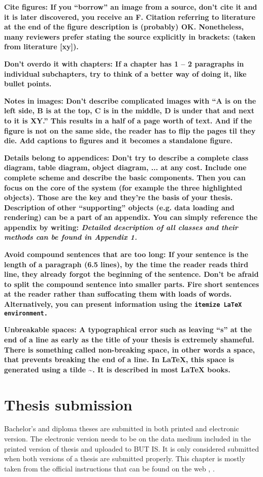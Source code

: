 \bf Cite figures: \rm If you ``borrow'' an image from a source, don't cite it and it is later discovered, you receive an F. Citation referring to literature at the end of the figure description is (probably) OK. Nonetheless, many reviewers prefer stating the source explicitly in brackets: (taken from literature [xy]).

\bf Don't overdo it with chapters: \rm If a chapter has 1 -- 2 paragraphs in individual subchapters, try to think of a better way of doing it, like bullet points.

\bf Notes in images: \rm Don't describe complicated images with ``A is on the left side, B is at the top, C is in the middle, D is under that and next to it is XY.'' This results in a half of a page worth of text. And if the figure is not on the same side, the reader has to flip the pages til they die. Add captions to figures and it becomes a standalone figure.

\bf Details belong to appendices: \rm Don't try to describe a complete class diagram, table diagram, object diagram, ... at any cost. Include one complete scheme and describe the basic components. Then you can focus on the core of the system (for example the three highlighted objects). Those are the key and they're the basis of your thesis. Description of other ``supporting'' objects (e.g. data loading and rendering) can be a part of an appendix. You can simply reference the appendix by writing: \it Detailed description of all classes and their methods can be found in Appendix 1. \rm

\bf Avoid compound sentences that are too long: \rm If your sentence is the length of a paragraph (6.5 lines), by the time the reader reads third line, they already forgot the beginning of the sentence. Don't be afraid to split the compound sentence into smaller parts. Fire short sentences at the reader rather than suffocating them with loads of words. Alternatively, you can present information using the \tt itemize \rm LaTeX environment.

\bf Unbreakable spaces: \rm A typographical error such as leaving ``s'' at the end of a line as early as the title of your thesis is extremely shameful. There is something called non-breaking space, in other words a space, that prevents breaking the end of a line. In LaTeX, this space is generated using a tilde \textasciitilde. It is described in most \LaTeX{} books.

\chapter{Thesis submission}
\label{odevzdani}
Bachelor's and diploma theses are submitted in both printed and electronic version. The electronic version needs to be on the data medium included in the printed version of thesis and uploaded to BUT IS. It is only considered submitted when both versions of a thesis are submitted properly. This chapter is mostly taken from the official instructions that can be found on the web \cite{formalniBP}, \cite{formalniDP}.

